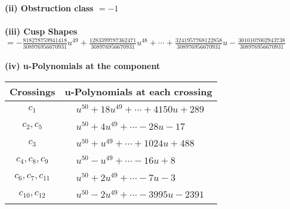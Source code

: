 \documentclass[1p]{elsarticle_modified}
\theoremstyle{definition}
\begin{document}
\flushleft \textbf{(ii) Obstruction class $= -1$}\\~\\
\flushleft \textbf{(iii) Cusp Shapes $= -\frac{818278759941418}{308976956670931} u^{49}+\frac{1283399787362471}{308976956670931} u^{48}+\cdots+\frac{3241957768122858}{308976956670931} u-\frac{3010107002943738}{308976956670931}$}\\~\\
\newpage\renewcommand{\arraystretch}{1}
\flushleft \textbf{(iv) u-Polynomials at the component}\newline \\
\begin{tabular}{m{50pt}|m{274pt}}
Crossings & \hspace{64pt}u-Polynomials at each crossing \\
\hline $$\begin{aligned}c_{1}\end{aligned}$$&$\begin{aligned}
&u^{50}+18 u^{49}+\cdots+4150 u+289
\end{aligned}$\\
\hline $$\begin{aligned}c_{2},c_{5}\end{aligned}$$&$\begin{aligned}
&u^{50}+4 u^{49}+\cdots-28 u-17
\end{aligned}$\\
\hline $$\begin{aligned}c_{3}\end{aligned}$$&$\begin{aligned}
&u^{50}+u^{49}+\cdots+1024 u+488
\end{aligned}$\\
\hline $$\begin{aligned}c_{4},c_{8},c_{9}\end{aligned}$$&$\begin{aligned}
&u^{50}- u^{49}+\cdots-16 u+8
\end{aligned}$\\
\hline $$\begin{aligned}c_{6},c_{7},c_{11}\end{aligned}$$&$\begin{aligned}
&u^{50}+2 u^{49}+\cdots-7 u-3
\end{aligned}$\\
\hline $$\begin{aligned}c_{10},c_{12}\end{aligned}$$&$\begin{aligned}
&u^{50}-2 u^{49}+\cdots-3995 u-2391
\end{aligned}$\\
\hline
\end{tabular}\\~\\
\end{document}
